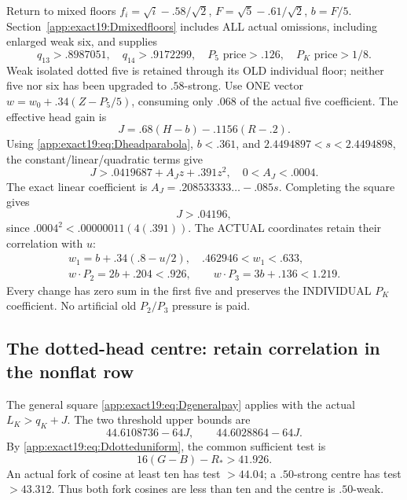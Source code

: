 \documentclass[11pt]{article}
\theoremstyle{definition}
\theoremstyle{remark}
\begin{document}
Return to mixed floors \(f_i=\sqrt i-.58/\sqrt2\),
\(F=\sqrt5-.61/\sqrt2\), \(b=F/5\).
Section~\ref{app:exact19:Dmixedfloors} includes ALL actual omissions,
including enlarged weak six, and supplies
\[
 q_{13}>.8987051,\quad q_{14}>.9172299,\quad
                  P_5\text{ price}>.126,\quad P_K\text{ price}>1/8 .
\]
Weak isolated dotted five is retained through its OLD individual floor;
neither five nor six has been upgraded to \(.58\)-strong.
Use ONE vector \(w=w_0+.34(Z-P_5/5)\), consuming only \(.068\)
of the actual five coefficient.
The effective head gain is
\[
                       J=.68(H-b)-.1156(R-.2).
\tag{D19dottedgain}\label{app:exact19:eq:Ddottedgain}
\]
Using \eqref{app:exact19:eq:Dheadparabola}, \(b<.361\), and
\(2.4494897<s<2.4494898\), the constant/linear/quadratic terms give
\[
                    J>.0419687+A_Jz+.391z^2,\quad 0<A_J<.0004 .
\]
The exact linear coefficient is \(A_J=.208533333\ldots-.085s\).
Completing the square gives
\[
                                  J>.04196 ,
\tag{D19dotteduniform}\label{app:exact19:eq:Ddotteduniform}
\]
since \(.0004^2<.00000011(4(.391))\).
The ACTUAL coordinates retain their correlation with \(u\):
\[
\begin{gathered}
 w_1=b+.34(.8-u/2),\quad .462946<w_1<.633,\\
 w\cdot P_2=2b+.204<.926,\qquad w\cdot P_3=3b+.136<1.219 .
\tag{D19dottedcoordinates}\label{app:exact19:eq:Ddottedcoordinates}
\end{gathered}
\]
Every change has zero sum in the first five and preserves the INDIVIDUAL
\(P_K\) coefficient. No artificial old \(P_2/P_3\) pressure is paid.

\subsection{The dotted-head centre: retain correlation in the nonflat row}
\label{app:exact19:Ddottedcentre}

The general square \eqref{app:exact19:eq:Dgeneralpay} applies with
the actual \(L_K>q_K+J\).
The two threshold upper bounds are
\[
                     44.6108736-64J,\qquad44.6028864-64J .
\]
By \eqref{app:exact19:eq:Ddotteduniform}, the common sufficient test is
\[
                              16(G-B)-R_*>41.926 .
\tag{D19dottedtest}\label{app:exact19:eq:Ddottedtest}
\]
An actual fork of cosine at least ten has test \(>44.04\);
a \(.50\)-strong centre has test \(>43.312\).
Thus both fork cosines are less than ten and the centre is \(.50\)-weak.
\end{document}
